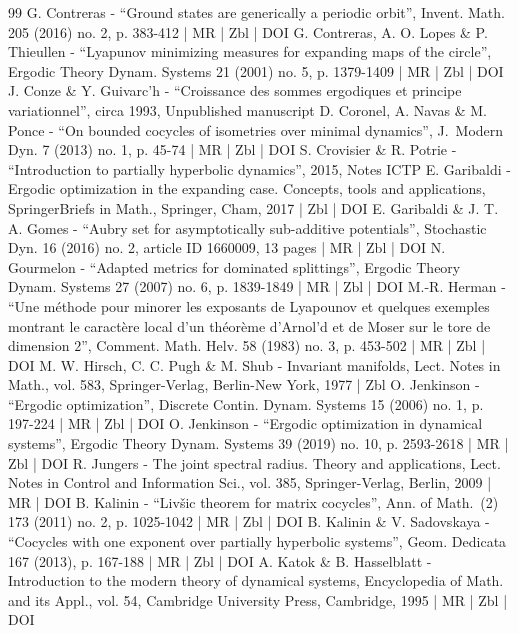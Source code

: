 \documentclass[10pt]{amsart}
\theoremstyle{plain}
\theoremstyle{definition}
\begin{document}
\begin{thebibliography}{99}
G. Contreras - “Ground states are generically a periodic orbit”, Invent. Math. 205 (2016) no. 2, p. 383-412 | MR | Zbl | DOI
G. Contreras, A. O. Lopes \& P. Thieullen - “Lyapunov minimizing measures for expanding maps of the circle”, Ergodic Theory Dynam. Systems 21 (2001) no. 5, p. 1379-1409 | MR | Zbl | DOI
J. Conze \& Y. Guivarc’h - “Croissance des sommes ergodiques et principe variationnel”, circa 1993, Unpublished manuscript
D. Coronel, A. Navas \& M. Ponce - “On bounded cocycles of isometries over minimal dynamics”, J. Modern Dyn. 7 (2013) no. 1, p. 45-74 | MR | Zbl | DOI
S. Crovisier \& R. Potrie - “Introduction to partially hyperbolic dynamics”, 2015, Notes ICTP
E. Garibaldi - Ergodic optimization in the expanding case. Concepts, tools and applications, SpringerBriefs in Math., Springer, Cham, 2017 | Zbl | DOI
E. Garibaldi \& J. T. A. Gomes - “Aubry set for asymptotically sub-additive potentials”, Stochastic Dyn. 16 (2016) no. 2, article ID 1660009, 13 pages | MR | Zbl | DOI
N. Gourmelon - “Adapted metrics for dominated splittings”, Ergodic Theory Dynam. Systems 27 (2007) no. 6, p. 1839-1849 | MR | Zbl | DOI
M.-R. Herman - “Une méthode pour minorer les exposants de Lyapounov et quelques exemples montrant le caractère local d’un théorème d’Arnol’d et de Moser sur le tore de dimension $2$”, Comment. Math. Helv. 58 (1983) no. 3, p. 453-502 | MR | Zbl | DOI
M. W. Hirsch, C. C. Pugh \& M. Shub - Invariant manifolds, Lect. Notes in Math., vol. 583, Springer-Verlag, Berlin-New York, 1977 | Zbl
O. Jenkinson - “Ergodic optimization”, Discrete Contin. Dynam. Systems 15 (2006) no. 1, p. 197-224 | MR | Zbl | DOI
O. Jenkinson - “Ergodic optimization in dynamical systems”, Ergodic Theory Dynam. Systems 39 (2019) no. 10, p. 2593-2618 | MR | Zbl | DOI
R. Jungers - The joint spectral radius. Theory and applications, Lect. Notes in Control and Information Sci., vol. 385, Springer-Verlag, Berlin, 2009 | MR | DOI
B. Kalinin - “Livšic theorem for matrix cocycles”, Ann. of Math. (2) 173 (2011) no. 2, p. 1025-1042 | MR | Zbl | DOI
B. Kalinin \& V. Sadovskaya - “Cocycles with one exponent over partially hyperbolic systems”, Geom. Dedicata 167 (2013), p. 167-188 | MR | Zbl | DOI
A. Katok \& B. Hasselblatt - Introduction to the modern theory of dynamical systems, Encyclopedia of Math. and its Appl., vol. 54, Cambridge University Press, Cambridge, 1995 | MR | Zbl | DOI

\end{thebibliography}
\end{document}
